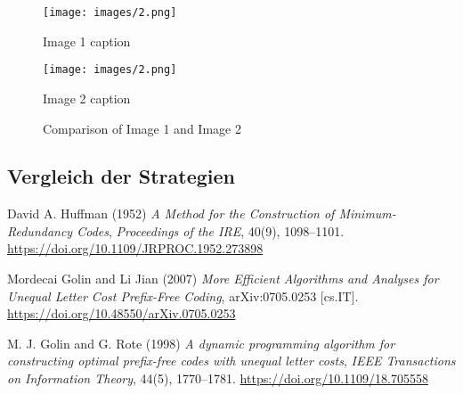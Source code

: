 \documentclass[a4paper,10pt,ngerman]{scrartcl}
\begin{document}
\begin{figure}[htbp]
  \centering
  \begin{minipage}[b]{0.45\textwidth}
    \centering
    \texttt{[image: images/2.png]}
    \caption*{Image 1 caption} %
  \end{minipage}
  \hfill
  \begin{minipage}[b]{0.45\textwidth}
    \centering
    \texttt{[image: images/2.png]}
    \caption*{Image 2 caption}
  \end{minipage}
  \caption{Comparison of Image 1 and Image 2}
  \label{fig:comparison2}
\end{figure}

\subsection{Vergleich der Strategien}

\begin{thebibliography}{9}
David A. Huffman (1952) \emph{A Method for the Construction of Minimum-Redundancy Codes}, 
\emph{Proceedings of the IRE}, 40(9), 1098--1101. 
\url{https://doi.org/10.1109/JRPROC.1952.273898}

Mordecai Golin and Li Jian (2007) \emph{More Efficient Algorithms and Analyses for Unequal Letter Cost Prefix-Free Coding}, 
arXiv:0705.0253 [cs.IT]. \url{https://doi.org/10.48550/arXiv.0705.0253}

M. J. Golin and G. Rote (1998) \emph{A dynamic programming algorithm for constructing optimal prefix-free codes with unequal letter costs}, 
\emph{IEEE Transactions on Information Theory}, 44(5), 1770--1781. 
\url{https://doi.org/10.1109/18.705558}


\end{thebibliography}
\end{document}
